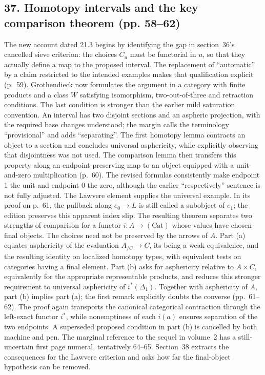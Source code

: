 \documentclass[10pt,oneside]{book}
\begin{document}
\subsection*{37. Homotopy intervals and the key comparison theorem (pp. 58--62)}
The new account dated 21.3 begins by identifying the gap in section~36's cancelled sieve criterion: the choices $C_u$ must be functorial in $u$, so that they actually define a map to the proposed interval. The replacement of ``automatic'' by a claim restricted to the intended examples makes that qualification explicit (p.~59). Grothendieck now formulates the argument in a category with finite products and a class $W$ satisfying isomorphism, two-out-of-three and retraction conditions. The last condition is stronger than the earlier mild saturation convention. An interval has two disjoint sections and an aspheric projection, with the required base changes understood; the margin calls the terminology ``provisional'' and adds ``separating''. The first homotopy lemma contracts an object to a section and concludes universal asphericity, while explicitly observing that disjointness was not used. The comparison lemma then transfers this property along an endpoint-preserving map to an object equipped with a unit-and-zero multiplication (p.~60). The revised formulas consistently make endpoint 1 the unit and endpoint 0 the zero, although the earlier ``respectively'' sentence is not fully adjusted. The Lawvere element supplies the universal example. In its proof on p.~61, the pullback along $e_0\to L$ is still called a subobject of $e_1$; the edition preserves this apparent index slip. The resulting theorem separates two strengths of comparison for a functor $i:A\to(\mathrm{Cat})$ whose values have chosen final objects. The choices need not be preserved by the arrows of $A$. Part (a) equates asphericity of the evaluation $A_{/C}\to C$, its being a weak equivalence, and the resulting identity on localized homotopy types, with equivalent tests on categories having a final element. Part (b) asks for asphericity relative to $A\times C$, equivalently for the appropriate representable products, and reduces this stronger requirement to universal asphericity of $i^*(\Delta_1)$. Together with asphericity of $A$, part (b) implies part (a); the first remark explicitly doubts the converse (pp.~61--62). The proof again transports the canonical categorical contraction through the left-exact functor $i^*$, while nonemptiness of each $i(a)$ ensures separation of the two endpoints. A superseded proposed condition in part (b) is cancelled by both machine and pen. The marginal reference to the sequel in volume~2 has a still-uncertain first page numeral, tentatively 64--65. Section~38 extracts the consequences for the Lawvere criterion and asks how far the final-object hypothesis can be removed.
\end{document}
